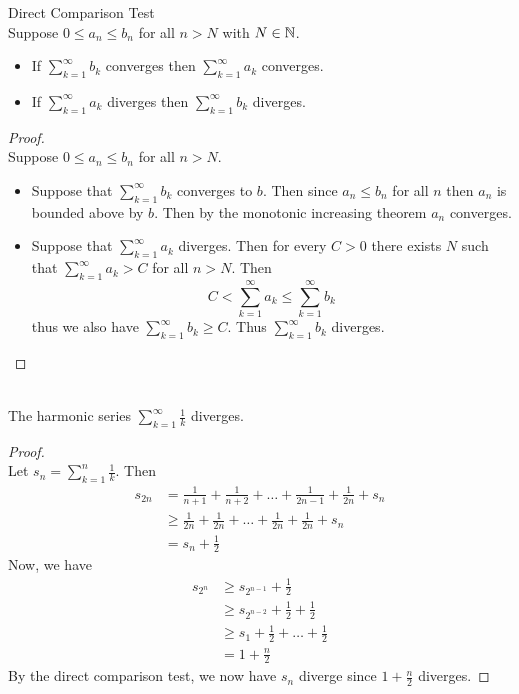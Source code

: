 \documentclass[a4paper]{article}
\begin{document}
\begin{thm}{Direct Comparison Test}{}\\ Suppose $0\leq a_n\leq b_n$ for all $n>N$ with $N\in\mathbb{N}$.
\begin{itemize}
\item If $\sum_{k=1}^\infty b_k$ converges then $\sum_{k=1}^\infty a_k$ converges. 
\item If $\sum_{k=1}^\infty a_k$ diverges then $\sum_{k=1}^\infty b_k$ diverges. 
\end{itemize}
\begin{proof}\\ Suppose $0\leq a_n\leq b_n$ for all $n>N$. 
\begin{itemize}
\item Suppose that $\sum_{k=1}^\infty b_k$ converges to $b$. Then since $a_n\leq b_n$ for all $n$ then $a_n$ is bounded above by $b$. Then by the monotonic increasing theorem $a_n$ converges. 
\item Suppose that $\sum_{k=1}^\infty a_k$ diverges. Then for every $C>0$ there exists $N$ such that $\sum_{k=1}^\infty a_k>C$ for all $n>N$. Then $$C<\sum_{k=1}^\infty a_k\leq\sum_{k=1}^\infty b_k$$ thus we also have $\sum_{k=1}^\infty b_k\geq C$. Thus $\sum_{k=1}^\infty b_k$ diverges. 
\end{itemize}
\end{proof}
\end{thm}

\begin{lmm}{}{}\\ The harmonic series $\sum_{k=1}^\infty\frac{1}{k}$ diverges. 
\begin{proof}\\ Let $s_n=\sum_{k=1}^{n}\frac{1}{k}$. Then
\begin{align*}
s_{2n}&=\frac{1}{n+1}+\frac{1}{n+2}+\dots+\frac{1}{2n-1}+\frac{1}{2n}+s_n\\
&\geq\frac{1}{2n}+\frac{1}{2n}+\dots+\frac{1}{2n}+\frac{1}{2n}+s_n\\
&=s_n+\frac{1}{2}
\end{align*}
Now, we have 
\begin{align*}
s_{2^n}&\geq s_{2^{n-1}}+\frac{1}{2}\\
&\geq s_{2^{n-2}}+\frac{1}{2}+\frac{1}{2}\\
&\geq s_1+\frac{1}{2}+\dots+\frac{1}{2}\tag{$n$ times}\\
&=1+\frac{n}{2}
\end{align*}
By the direct comparison test, we now have $s_n$ diverge since $1+\frac{n}{2}$ diverges. 
\end{proof}
\end{lmm}
\end{document}
